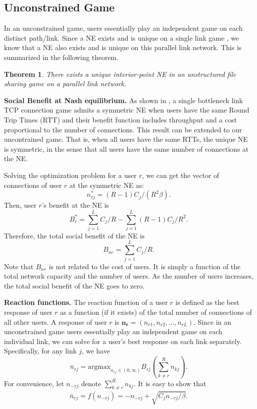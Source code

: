 \documentclass[conference]{IEEEtran}
\newtheorem{theorem}{Theorem}
\begin{document}


\subsection{Unconstrained Game}
In an unconstrained game,
users essentially play an independent game on each distinct
path/link. Since a NE exists and is unique on a single link game
\cite{zhang05tcpgame_icnp}, we know that a NE also exists and is
unique on this parallel link network. This is summarized in the
following theorem.

\begin{theorem}
There exists a unique interior-point NE in an unstructured file
sharing game on a parallel link network.
\end{theorem}

\bigskip
\noindent \textbf{Social Benefit at Nash equilibrium.} As shown in
\cite{zhang05tcpgame_icnp}, a single bottleneck link TCP
connection game admits a symmetric NE when users have the same
Round Trip Times (RTT) and their benefit function includes
throughput and a cost proportional to the number of connections.
This result can be extended to our uncontrained game. That is,
when all users have the same RTTs, the unique NE is symmetric, in
the sense that all users have the same number of connections at
the NE.

Solving the optimization problem for a user $r$, we can get the
vector of connections of user $r$ at the symmetric NE as:
$$
n^*_{rj} = (R-1) C_j / (R^2 \beta).$$ Then, user $r$'s benefit at
the NE is $$ B_r^*=\sum_{j=1}^L C_j/R - \sum_{j=1}^L
(R-1)C_j/R^2.$$ Therefore, the total social benefit of the NE is
$$B_{ne}=\sum_{j=1}^{L} C_j/R.$$ Note that $B_{ne}$ is not related
to the cost of users. It is simply a function of the total network
capacity and the number of users. As the number of users
increases, the total social benefit of the NE goes to zero.

\bigskip
\noindent \textbf{Reaction functions.} The reaction function of a
user $r$ is defined as the best response of user $r$ as a function
(if it exists) of the total number of connections of all other
users. A response of user $r$ is
$\mathbf{n_r}=(n_{r1},n_{r2},...,n_{rL})$. Since in an
unconstrained game users essentially play an independent game on
each individual link, we can solve for a user's best response on
each link separately. Specifically, for any link $j$, we have
\begin{equation}
\bar{n}_{rj}=\mbox{argmax}_{n_{rj}\in (0, \infty)}
B_{rj}(\sum_{k\ne r}^R n_{kj}).
\end{equation}
For convenience,
let $n_{-rj}$ denote $\sum_{k\ne r}^R n_{kj}$. It is easy to show
that
\begin{equation}
\bar{n}_{rj}= f(n_{-rj}) = -n_{-rj} + \sqrt{C_j n_{-rj}/\beta}.
\label{eqn:react}
\end{equation}
\end{document}
